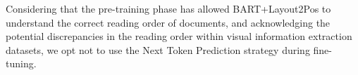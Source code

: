 Considering that the pre-training phase has allowed BART+Layout2Pos to understand the correct reading order of documents, and acknowledging the potential discrepancies in the reading order within visual information extraction datasets, we opt not to use the Next Token Prediction strategy during fine-tuning.


